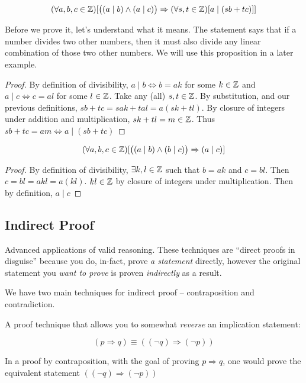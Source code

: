 \documentclass[main.tex]{subfiles}
\begin{document}
\begin{prop}\label{prop:3.x-lin-combo-div}
	\[(\forall a,b,c \in \mathbb{Z})[\big((a \mid b) \land (a \mid c)\big) \Rightarrow (\forall s,t \in \mathbb{Z})[a \mid (sb + tc)]]\]
\end{prop}

Before we prove it, let's understand what it means. The statement says that if a number divides two other numbers, then it must also divide any linear combination of those two other numbers. We will use this proposition in a later example.

\begin{proof}
	By definition of divisibility, \(a \mid b \Leftrightarrow b = ak\) for some \(k \in \mathbb{Z}\) and \(a \mid c \Leftrightarrow c = al\) for some \(l \in \mathbb{Z}\). Take any (all) \(s,t \in \mathbb{Z}\). By substitution, and our previous definitions, \(sb + tc = sak + tal = a(sk + tl)\). By closure of integers under addition and multiplication, \(sk + tl = m \in \mathbb{Z}\). Thus \(sb + tc = am \Leftrightarrow a \mid (sb + tc)\)
\end{proof}

\begin{prop}
	\[(\forall a,b,c \in \mathbb{Z})[\big((a \mid b) \land (b \mid c)\big) \Rightarrow (a \mid c)]\]
\end{prop}

\begin{proof}
	By definition of divisibility, \(\exists k,l \in \mathbb{Z}\) such that \(b = ak\) and \(c = bl\). Then \(c = bl = akl = a(kl)\). \(kl \in \mathbb{Z}\) by closure of integers under multiplication. Then by definition, \(a \mid c\)
\end{proof}

\subsection{Indirect Proof}

Advanced applications of valid reasoning. These techniques are ``direct proofs in disguise'' because you do, in-fact, prove \textit{a statement} directly, however the original statement you \textit{want to prove} is proven \textit{indirectly} as a result.

We have two main techniques for indirect proof -- contraposition and contradiction.

\begin{defn}
	A proof technique that allows you to somewhat \textit{reverse} an implication statement:
	
	\[(p \Rightarrow q) \equiv ((\lnot q) \Rightarrow (\lnot p))\]
	
	In a proof by contraposition, with the goal of proving \(p \Rightarrow q\), one would prove the equivalent statement \(((\lnot q) \Rightarrow (\lnot p))\)
\end{defn}
\end{document}
